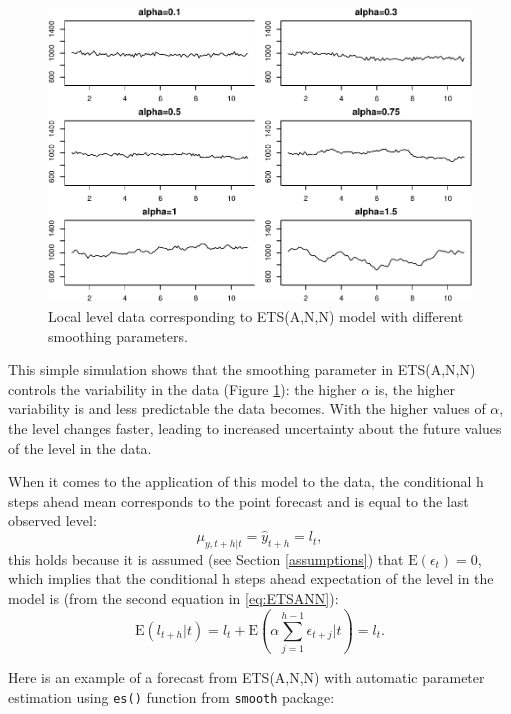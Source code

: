 \documentclass[]{book}
\theoremstyle{definition}
\theoremstyle{definition}
\theoremstyle{definition}
\theoremstyle{definition}
\theoremstyle{remark}
\begin{document}
\begin{figure}
\centering
\includegraphics{Svetunkov--2022----ADAM_files/figure-latex/DGPetsANNExample-1.pdf}
\caption{\label{fig:DGPetsANNExample}Local level data corresponding to ETS(A,N,N) model with different smoothing parameters.}
\end{figure}

This simple simulation shows that the smoothing parameter in ETS(A,N,N) controls the variability in the data (Figure \ref{fig:DGPetsANNExample}): the higher \(\alpha\) is, the higher variability is and less predictable the data becomes. With the higher values of \(\alpha\), the level changes faster, leading to increased uncertainty about the future values of the level in the data.

When it comes to the application of this model to the data, the conditional h steps ahead mean corresponds to the point forecast and is equal to the last observed level:
\begin{equation}
    \mu_{y,t+h|t} = \hat{y}_{t+h} = l_{t} ,
  \label{eq:ETSANNForecast}
\end{equation}
this holds because it is assumed (see Section \ref{assumptions}) that \(\mathrm{E}(\epsilon_t)=0\), which implies that the conditional h steps ahead expectation of the level in the model is (from the second equation in \eqref{eq:ETSANN}):
\begin{equation}
  \mathrm{E}(l_{t+h}|t) = l_t + \mathrm{E}(\alpha\sum_{j=1}^{h-1}\epsilon_{t+j}|t) = l_t .
  \label{eq:ETSANNForecasthStepsAhead}
\end{equation}

Here is an example of a forecast from ETS(A,N,N) with automatic parameter estimation using \texttt{es()} function from \texttt{smooth} package:
\end{document}
